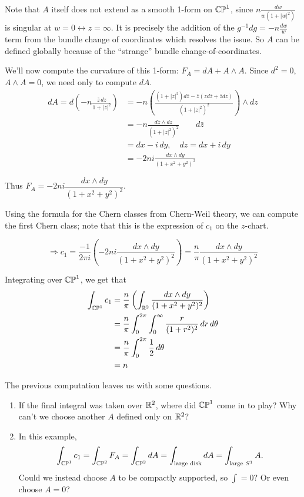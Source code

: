 \documentclass[main]{subfiles}
\begin{document}
Note that $A$ itself does not extend as a smooth 1-form on $\mathbb{CP}^1$, since $n\frac{dw}{w(1+|w|^2)}$ is singular at $w=0 \leftrightarrow z=\infty$. 
It is precisely the addition of the $g^{-1}dg=-n\frac{dw}{w}$ term from the bundle change of coordinates which resolves the issue. So $A$ can be defined globally because of the ``strange'' bundle change-of-coordinates.

We'll now compute the curvature of this 1-form: $F_A = dA + A\wedge A$. Since $d^2 = 0$, $A\wedge A = 0$, we need only to compute $dA$.
\begin{align*}
dA = d\left(-n\frac{\bar z\,dz}{1+|z|^2}\right) 
&= -n\left(\frac{(1+|z|^2)d\bar z - \bar z(zd\bar z + \bar z dz)}{(1+|z|^2)^2}\right)\wedge dz\\
&= -n\frac{d\bar z \wedge dz}{(1+|z|^2)^2} \qquad d\bar z \\
&= dx - i\,dy,\quad dz = dx+i\,dy\\
&= -2ni\frac{dx\wedge dy}{(1+x^2+y^2)^2}
\end{align*}


Thus $F_A = -2ni\dfrac{dx\wedge dy}{(1+x^2+y^2)^2}$.

Using the formula for the Chern classes from Chern-Weil theory, we can compute the first Chern class; note that this is the expression of $c_1$ on the $z$-chart.


\[
\Rightarrow c_1 = \frac{-1}{2\pi i}\left(-2ni\frac{dx\wedge dy}{(1+x^2+y^2)^2}\right) = \frac{n}{\pi}\frac{dx\wedge dy}{(1+x^2+y^2)^2}
\]

Integrating over $\mathbb{CP}^1$, we get that 
\begin{align*}
\int_{\mathbb{CP}^1} c_1 &= \frac{n}{\pi}\left(\int_{\mathbb R^2} \frac{dx\wedge dy}{(1+x^2+y^2)^2}\right) \\
&= \frac{n}{\pi}\int_{0}^{2\pi} \int_{0}^{\infty} \frac{r}{(1+r^2)^2} \, dr \, d\theta \\
&= \frac{n}{\pi} \int_{0}^{2\pi} \frac{1}{2} \, d\theta \\
&= n
\end{align*}

The previous computation leaves us with some questions.
\begin{enumerate}
	\item If the final integral was taken over $\mathbb R^2$, where did $\mathbb{CP}^1$ come in to play? Why can't we choose another $A$ defined only on $\mathbb R^2$?
	\item In this example,
	\[
	\int_{\mathbb{CP}^1} c_1 = \int_{\mathbb{CP}^2} F_A = \int_{\mathbb{CP}^2} dA = \int_{\text{large disk}} dA = \int_{\text{large } S^1} A.
	\]
	Could we instead choose $A$ to be compactly supported, so $\int = 0$? Or even choose $A=0$?
\end{enumerate}
\end{document}
